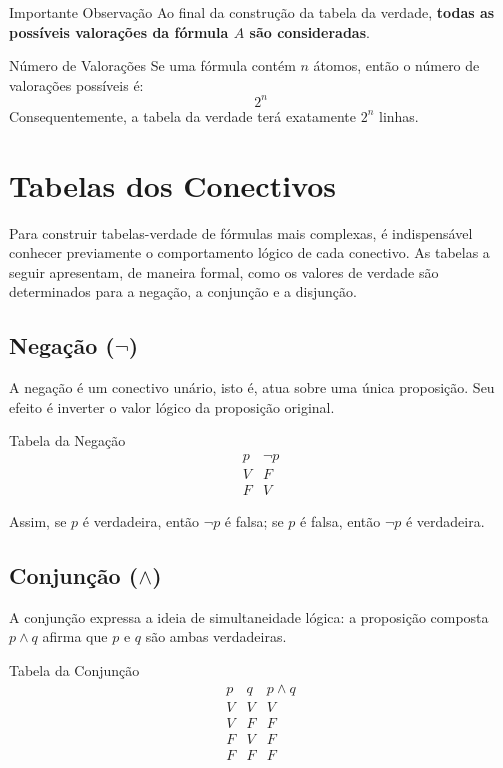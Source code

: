 \documentclass[12pt,a4paper,openright]{book}
\begin{document}
\begin{block}{Importante Observação}
Ao final da construção da tabela da verdade, \textbf{todas as possíveis valorações da fórmula $A$ são consideradas}.
\end{block}

\begin{block}{Número de Valorações}
Se uma fórmula contém $n$ átomos, então o número de valorações possíveis é:
\[
2^n
\]
Consequentemente, a tabela da verdade terá exatamente $2^n$ linhas.
\end{block}
\section{Tabelas dos Conectivos}

Para construir tabelas-verdade de fórmulas mais complexas, é indispensável conhecer previamente o comportamento lógico de cada conectivo. As tabelas a seguir apresentam, de maneira formal, como os valores de verdade são determinados para a negação, a conjunção e a disjunção.

\subsection*{Negação ($\neg$)}

A negação é um conectivo unário, isto é, atua sobre uma única proposição. Seu efeito é inverter o valor lógico da proposição original.

\begin{block}{Tabela da Negação}
\[
\begin{array}{c|c}
p & \neg p \\ \hline
V & F \\
F & V
\end{array}
\]
\end{block}

Assim, se \(p\) é verdadeira, então \(\neg p\) é falsa; se \(p\) é falsa, então \(\neg p\) é verdadeira.

\subsection*{Conjunção ($\land$)}

A conjunção expressa a ideia de simultaneidade lógica: a proposição composta \(p \land q\) afirma que \(p\) e \(q\) são ambas verdadeiras.

\begin{block}{Tabela da Conjunção}
\[
\begin{array}{c|c|c}
p & q & p \land q \\ \hline
V & V & V \\
V & F & F \\
F & V & F \\
F & F & F
\end{array}
\]
\end{block}
\end{document}
